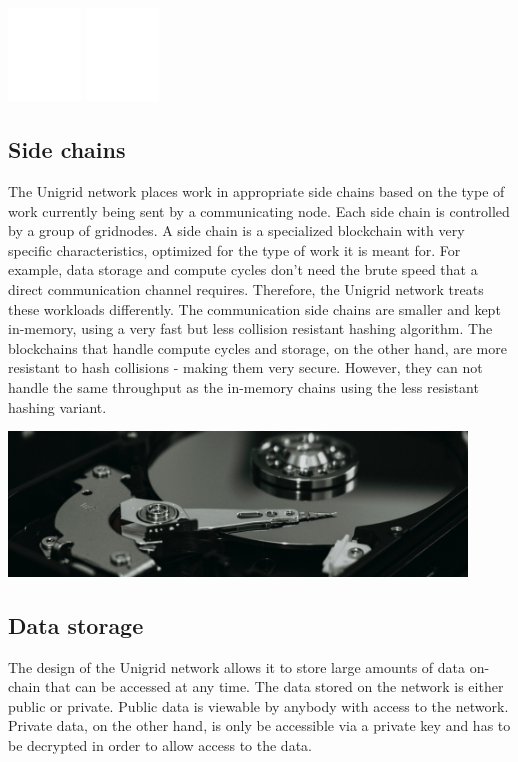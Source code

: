 \documentclass{article}
\begin{document}
\begin{center}
\includegraphics[width=55pt]{efficiency}
\hspace{1.5cm}
\includegraphics[width=55pt]{segmented}
\end{center}
\subsection{Side chains}
The Unigrid network places work in appropriate side chains based on the type of work currently being sent by a communicating node. Each side chain is controlled by a group of gridnodes. A side chain is a specialized blockchain with very specific characteristics, optimized for the type of work it is meant for. For example, data storage and compute cycles don't need the brute speed that a direct communication channel requires. Therefore, the Unigrid network treats these workloads differently. The communication side chains are smaller and kept in-memory, using a very fast but less collision resistant hashing algorithm. The blockchains that handle compute cycles and storage, on the other hand, are more resistant to hash collisions - making them very secure. However, they can not handle the same throughput as the in-memory chains using the less resistant hashing variant.
\begin{mdframed}[style=textimage]
	\includegraphics[width=345pt]{hard-drive}
\end{mdframed}
\subsection{Data storage}
The design of the Unigrid network allows it to store large amounts of data on-chain that can be accessed at any time. The data stored on the network is either public or private. Public data is viewable by anybody with access to the network. Private data, on the other hand, is only be accessible via a private key and has to be decrypted in order to allow access to the data.
\end{document}
